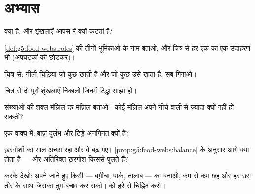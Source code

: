 \section{अभ्यास}

\begin{exercise}[$\star$]\label{exo:g5:food-webs:1}
 क्या है, और शृंखलाएँ आपस में क्यों कटती हैं?
\end{exercise}

\begin{exercise}[$\star$]\label{exo:g5:food-webs:2}
\cref{def:g5:food-webs:roles} की तीनों भूमिकाओं के नाम बताओ, और चित्र
से हर एक का एक उदाहरण भी (अपघटकों को छोड़कर)।
\end{exercise}

\begin{exercise}[$\star$]\label{exo:g5:food-webs:3}
चित्र से: नीली चिड़िया जो कुछ खाती है और जो कुछ उसे खाता है, सब गिनाओ।
\end{exercise}

\begin{exercise}[$\star$]\label{exo:g5:food-webs:4}
चित्र से दो पूरी शृंखलाएँ निकालो जिनमें टिड्डा साझा हो।
\end{exercise}

\begin{exercise}[$\star$]\label{exo:g5:food-webs:5}
संख्याओं की शक्ल मंज़िल दर मंज़िल बताओ। कोई मंज़िल अपने नीचे वाली से
ज़्यादा क्यों नहीं हो सकती?
\end{exercise}

\begin{exercise}[$\star$]\label{exo:g5:food-webs:6}
एक वाक्य में: बाज़ दुर्लभ और टिड्डे अनगिनत क्यों हैं?
\end{exercise}

\begin{exercise}[$\star$]\label{exo:g5:food-webs:7}
ख़रगोशों का साल अच्छा रहा और वे बढ़ गए।
\cref{prop:g5:food-webs:balance} के अनुसार आगे क्या होता है --- और
अतिरिक्त ख़रगोश किससे घुलते हैं?
\end{exercise}

\begin{exercise}[$\star$]\label{exo:g5:food-webs:8}
करके देखो: अपने जाने हुए किसी  --- बग़ीचा, पार्क, तालाब --- का  बनाओ, कम से कम छह  और हर उस तीर के साथ जिसका तुम बचाव कर
सको।  को हरे से चिह्नित करो।
\end{exercise}

